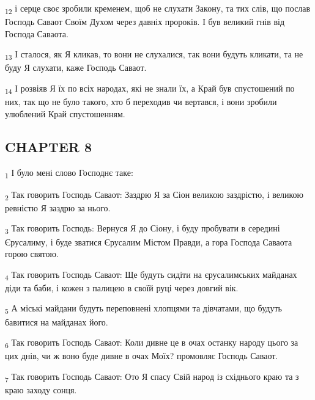 \begin{tcolorbox}
\textsubscript{12} і серце своє зробили кременем, щоб не слухати Закону, та тих слів, що послав Господь Саваот Своїм Духом через давніх пророків. І був великий гнів від Господа Саваота.
\end{tcolorbox}
\begin{tcolorbox}
\textsubscript{13} І сталося, як Я кликав, то вони не слухалися, так вони будуть кликати, та не буду Я слухати, каже Господь Саваот.
\end{tcolorbox}
\begin{tcolorbox}
\textsubscript{14} І розвіяв Я їх по всіх народах, які не знали їх, а Край був спустошений по них, так що не було такого, хто б переходив чи вертався, і вони зробили улюблений Край спустошенням.
\end{tcolorbox}
\subsection{CHAPTER 8}
\begin{tcolorbox}
\textsubscript{1} І було мені слово Господнє таке:
\end{tcolorbox}
\begin{tcolorbox}
\textsubscript{2} Так говорить Господь Саваот: Заздрю Я за Сіон великою заздрістю, і великою ревністю Я заздрю за нього.
\end{tcolorbox}
\begin{tcolorbox}
\textsubscript{3} Так говорить Господь: Вернуся Я до Сіону, і буду пробувати в середині Єрусалиму, і буде зватися Єрусалим Містом Правди, а гора Господа Саваота горою святою.
\end{tcolorbox}
\begin{tcolorbox}
\textsubscript{4} Так говорить Господь Саваот: Ще будуть сидіти на єрусалимських майданах діди та баби, і кожен з палицею в своїй руці через довгий вік.
\end{tcolorbox}
\begin{tcolorbox}
\textsubscript{5} А міські майдани будуть переповнені хлопцями та дівчатами, що будуть бавитися на майданах його.
\end{tcolorbox}
\begin{tcolorbox}
\textsubscript{6} Так говорить Господь Саваот: Коли дивне це в очах останку народу цього за цих днів, чи ж воно буде дивне в очах Моїх? промовляє Господь Саваот.
\end{tcolorbox}
\begin{tcolorbox}
\textsubscript{7} Так говорить Господь Саваот: Ото Я спасу Свій народ із східнього краю та з краю заходу сонця.
\end{tcolorbox}
